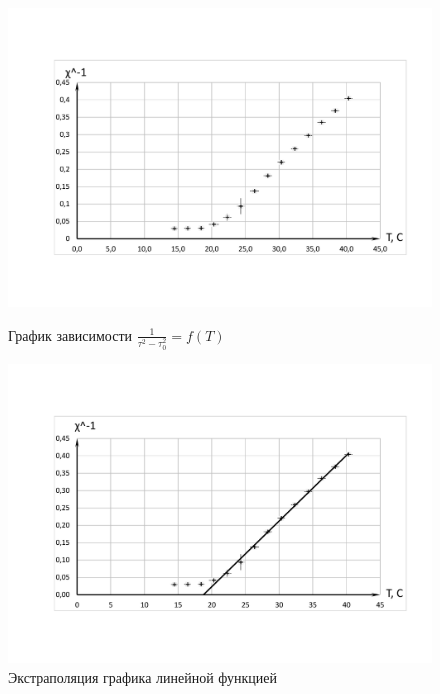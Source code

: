 \documentclass[10pt,a4paper]{article}
\begin{document}
	\begin{figure}[h!]
		\begin{center}
			\begin{minipage}[h]{0.49\linewidth}
				\hspace{-2,5cm}
				\includegraphics[width=1.4\linewidth]{Graph_final_1}
				\caption{График зависимости $\frac{1}{\tau^{2} - \tau^{2}_{0}} = f\left(T\right)$} %
				\label{ris:Graph_final_1} %
			\end{minipage}
		\hfill
			\begin{minipage}[h]{0.49\linewidth}
				\hspace{-1,5cm}
				\includegraphics[width=1.4\linewidth]{Graph_final_2}
				\caption{Экстраполяция графика линейной функцией}
				\label{ris:Graph_final_2}
			\end{minipage}
		\end{center}
	\end{figure}
	
\end{document}
